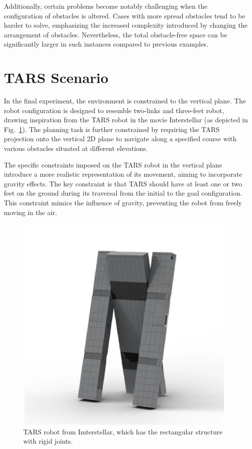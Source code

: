 \documentclass{IEEEtaes}
\begin{document}
Additionally, certain problems become notably challenging when the configuration of obstacles is altered. Cases with more spread obstacles tend to be harder to solve, emphasizing the increased complexity introduced by changing the arrangement of obstacles. Nevertheless, the total obstacle-free space can be significantly larger in such instances compared to previous examples.

\section{\large \textbf{TARS Scenario}}

In the final experiment, the environment is constrained to the vertical plane. The robot configuration is designed to resemble two-links and three-feet robot, drawing inspiration from the TARS robot in the movie Interstellar (as depicted in Fig.~\ref{tars-fig}). The planning task is further constrained by requiring the TARS projection onto the vertical 2D plane to navigate along a specified course with various obstacles situated at different elevations.

The specific constraints imposed on the TARS robot in the vertical plane introduce a more realistic representation of its movement, aiming to incorporate gravity effects. The key constraint is that TARS should have at least one or two feet on the ground during its traversal from the initial to the goal configuration. This constraint mimics the influence of gravity, preventing the robot from freely moving in the air.

\begin{figure}[t]
    \begin{center}
        \includegraphics[width=0.68\linewidth]{figures/TARS-FIG.pdf}
     \end{center}
     \vspace{-1em}
     \caption{TARS robot from Imterstellar, which has the rectangular structure with rigid joints.}
     \label{tars-fig}
     \vspace{-1em}
\end{figure}
\end{document}
